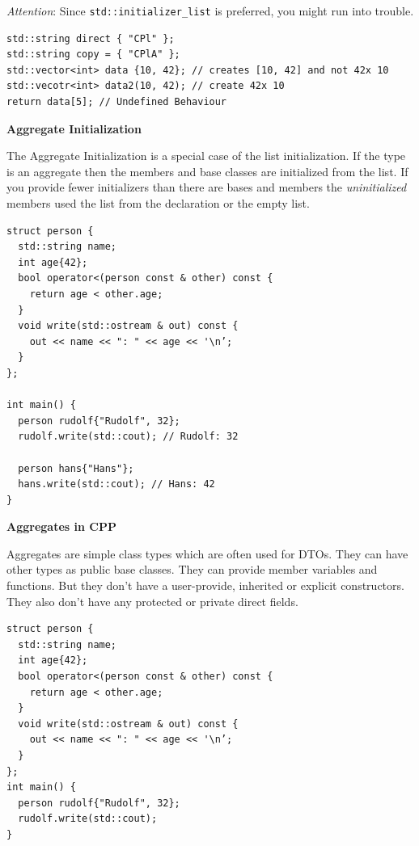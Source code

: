 \documentclass[11pt,twoside,landscape]{article}
\begin{document}
\begin{multicols}{3}
\emph{Attention}: Since \texttt{std::initializer\_list} is preferred, you might run into trouble.


\lstset{language=c++,label= ,caption= ,captionpos=b,numbers=none}
\begin{lstlisting}
std::string direct { "CPl" };
std::string copy = { "CPlA" };
std::vector<int> data {10, 42}; // creates [10, 42] and not 42x 10
std::vecotr<int> data2(10, 42); // create 42x 10
return data[5]; // Undefined Behaviour
\end{lstlisting}

\textbf{Aggregate Initialization}

The Aggregate Initialization is a special case of the list initialization.
If the type is an aggregate then the members and base classes are initialized from the list.
If you provide fewer initializers than there are bases and members the \emph{uninitialized} members used the list from the declaration or the empty list.

\lstset{language=c++,label= ,caption= ,captionpos=b,numbers=none}
\begin{lstlisting}
struct person {
  std::string name;
  int age{42};
  bool operator<(person const & other) const {
    return age < other.age;
  }
  void write(std::ostream & out) const {
    out << name << ": " << age << '\n’;
  }
};

int main() {
  person rudolf{"Rudolf", 32};
  rudolf.write(std::cout); // Rudolf: 32

  person hans{"Hans"};
  hans.write(std::cout); // Hans: 42
}
\end{lstlisting}

\textbf{Aggregates in CPP}

Aggregates are simple class types which are often used for DTOs.
They can have other types as public base classes.
They can provide member variables and functions.
But they don't have a user-provide, inherited or explicit constructors.
They also don't have any protected or private direct fields.


\lstset{language=c++,label= ,caption= ,captionpos=b,numbers=none}
\begin{lstlisting}
struct person {
  std::string name;
  int age{42};
  bool operator<(person const & other) const {
    return age < other.age;
  }
  void write(std::ostream & out) const {
    out << name << ": " << age << '\n’;
  }
};
int main() {
  person rudolf{"Rudolf", 32};
  rudolf.write(std::cout);
}
\end{lstlisting}


\end{multicols}
\end{document}
